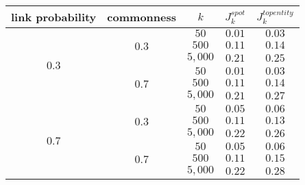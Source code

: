 
\begin{tabular}{ccccc}
\toprule
link probability & commonness & $k$ & $J^{spot}_k$ & $J^{top entity}_k$ \\
\midrule
\multirow{6}{*}{$0.3$} &  \multirow{3}{*}{$0.3$} & $50$ &  $0.01$  &   $0.03$  \\
					 &						   & $500$ 	&  $0.11$  &   $0.14$  \\
					 &						   & $5,000$ & $0.21$   &  $0.25$    \\
\cline{2-5}
					 &	\multirow{3}{*}{$0.7$}  & $50$      & $0.01$   &   $0.03$ \\
					 &						   & $500$   	& $0.11$   &   $0.14$  \\
					 &						   & $5,000$ 	& $0.21$   &   $0.27$    \\
					
\midrule		
\multirow{6}{*}{$0.7$} &  \multirow{3}{*}{$0.3$}   & $50$  & $0.05$   &   $0.06$  \\
					 &						   & $500$ 	   &   $0.11$   &    $0.13$  \\
					 &						   & $5,000$   &   $0.22$   &  $0.26$  \\
\cline{2-5}

					 &	\multirow{3}{*}{$0.7$}  & $50$   &  $0.05$   &  $0.06$  \\
					 &						   & $500$   &  $0.11$   &   $0.15$   \\
					 &						   & $5,000$ &  $0.22$   &   $0.28$  \\
\bottomrule
\end{tabular}

